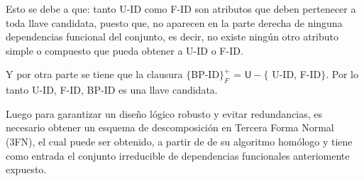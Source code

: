 \documentclass{report}
\begin{document}
    Esto se debe a que: tanto U-ID como F-ID son atributos que deben pertenecer a toda llave candidata, puesto que,
    no aparecen en la parte derecha de ninguna dependencias funcional del conjunto, es decir, no existe ningún
    otro atributo simple o compuesto que pueda obtener a U-ID o F-ID. \newline
    
    Y por otra parte se tiene que la clausura $\{$BP-ID$\}_{F}^{+}$ = $\mathsf{U} - \{$ U-ID, F-ID$\}$. Por lo tanto U-ID, F-ID, BP-ID es una llave candidata. \newline

    Luego para garantizar un diseño lógico robusto y evitar redundancias, es necesario obtener un esquema de descomposición en Tercera Forma Normal (3FN),
    el cual puede ser obtenido, a partir de de su algoritmo homólogo y tiene como entrada el conjunto irreducible de dependencias funcionales anteriomente expuesto. \newline
      
\end{document}
